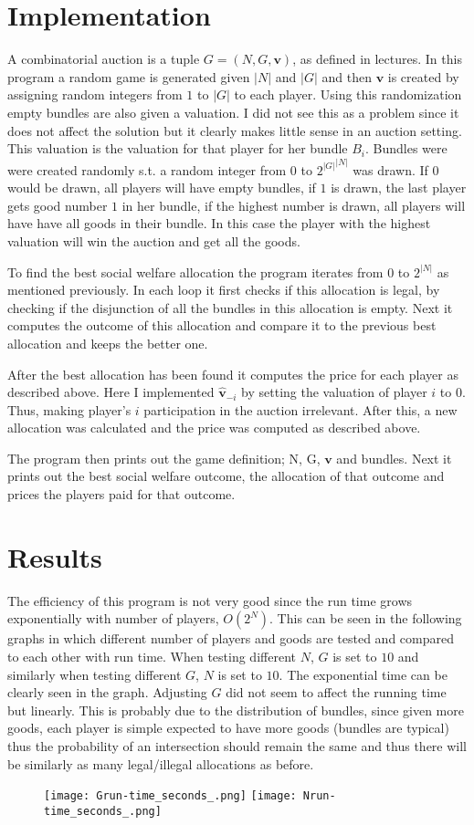 \documentclass[12pt]{article}
\begin{document}
\section{Implementation}
A combinatorial auction is a tuple $G=(N,G,\boldsymbol{v})$, as defined in lectures. In this program a random game is generated given $|N|$ and $|G|$ and then $\boldsymbol{v}$ is created by assigning random integers from $1$ to $|G|$ to each player. Using this randomization empty bundles are also given a valuation. I did not see this as a problem since it does not affect the solution but it clearly makes little sense in an auction setting. This valuation is the valuation for that player for her bundle $B_i$. Bundles were were created randomly s.t. a random integer from $0$ to ${2^{|G|}}^{|N|}$ was drawn. If $0$ would be drawn, all players will have empty bundles, if $1$ is drawn, the last player gets good number $1$ in her bundle, if the highest number is drawn, all players will have have all goods in their bundle. In this case the player with the highest valuation will win the auction and get all the goods.

To find the best social welfare allocation the program iterates from $0$ to $2^|N|$ as mentioned previously. In each loop it first checks if this allocation is legal, by checking if the disjunction of all the bundles in this allocation is empty. Next it computes the outcome of this allocation and compare it to the previous best allocation and keeps the better one.

After the best allocation has been found it computes the price for each player as described above. Here I implemented $\boldsymbol{\hat{v}}_{-i}$ by setting the valuation of player $i$ to 0. Thus, making player's $i$ participation in the auction irrelevant. After this, a new allocation was calculated and the price was computed as described above.

The program then prints out the game definition; N, G, $\boldsymbol{v}$ and bundles. Next it prints out the best social welfare outcome, the allocation of that outcome and prices the players paid for that outcome.

\section{Results}
The efficiency of this program is not very good since the run time grows exponentially with number of players, $O(2^N)$. This can be seen in the following graphs in which different number of players and goods are tested and compared to each other with run time. When testing different $N$, $G$ is set to $10$ and similarly when testing different $G$, $N$ is set to $10$. The exponential time can be clearly seen in the graph. Adjusting $G$ did not seem to affect the running time but linearly. This is probably due to the distribution of bundles, since given more goods, each player is simple expected to have more goods (bundles are typical) thus the probability of an intersection should remain the same and thus there will be similarly as many legal/illegal allocations as before.

\begin{figure}[H]
  \texttt{[image: Grun-time\_seconds\_.png]}
  \texttt{[image: Nrun-time\_seconds\_.png]}
\end{figure}
\end{document}
